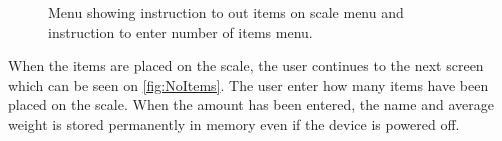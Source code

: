 \begin{figure}[H]
	\centering
	\hfill
	\caption{Menu showing instruction to out items on scale menu and instruction to enter number of items menu.}	
\end{figure}

When the items are placed on the scale, the user continues to the next screen which can be seen on \cref{fig:NoItems}. The user enter how many items have been placed on the scale. When the amount has been entered, the name and average weight is stored permanently in memory even if the device is powered off.

